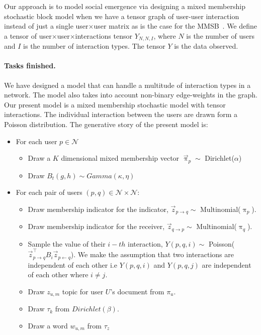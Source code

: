 Our approach is to model social emergence via designing a mixed membership
stochastic block model when we have a tensor graph of user-user interaction 
instead of just a single user$\times$user matrix as is the case for the
MMSB~\cite{Airoldi:2008:MMS:1390681.1442798}. We define a tensor 
of user$\times$user$\times$interactions tensor $Y_{N,N,I}$, where $N$ is 
the number of users and $I$ is the number of interaction types. The tensor 
$Y$ is the data observed.

\paragraph{Tasks finished.} We have designed a model that can handle a multitude
of interaction types in a network. The model also takes into account non-binary 
edge-weights in the graph. Our present model is a mixed membership
stochastic model with tensor interactions. The individual interaction between the 
users are drawn form a Poisson distribution.
The generative story of the present model is:  
\begin{itemize}
  \item For each user $p \in \mathcal{N}$
  \begin{itemize}
    \item Draw a $K$ dimensional mixed membership vector 
    $\overset{\rightarrow}{\uppi}_{p} \sim$ Dirichlet($\alpha$)

    \item Draw $B_t(g,h) \sim Gamma(\kappa,\eta)$
  \end{itemize}

  \item For each pair of users $(p, q) \in \mathcal{N} \times \mathcal{N}$:
  \begin{itemize}
    \item Draw membership indicator for the indicator, 
    $\overset{\rightarrow}{z}_{p \rightarrow q} \sim$ Multinomial($\uppi_{p}$).
    \item Draw membership indicator for the receiver, $\overset{\rightarrow}{z}_{q
    \rightarrow p} \sim$ Multinomial($\uppi_{q}$).
    \item Sample the value of their $i-th$ interaction, $Y(p,q,i) \sim$
    Poisson(${\overset{\rightarrow}{z}}^{\top}_{p \rightarrow q}
    B_{i}\overset{\rightarrow}{z}_{p \leftarrow q}$). We make the assumption that
    two interactions are independent of each other i.e $Y(p,q,i)$ and $Y(p,q,j)$
    are independent of each other where $i\neq j$.
    \item Draw $z_{u,m}$ topic for user $U$'s document from $\pi_u$.
    \item Draw $\tau_{k}$ from $Dirichlet(\beta)$.
    \item Draw a word $w_{u,m}$ from $\tau_{z}$
  \end{itemize}
\end{itemize}  


